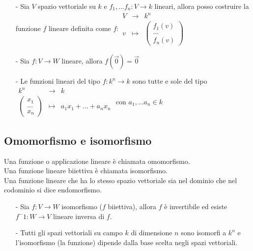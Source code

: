 \documentclass[a4paper]{article}
\newcommand\f[4]{\begin{smallmatrix} {#1} &\to &{#2} \\ {#3} &\mapsto &{#4} \end{smallmatrix}}
\newcommand\psmatrix[3]{\left( \begin{smallmatrix} {#1} \\ {#2} \\ {#3} \end{smallmatrix} \right)}
\begin{document}
\begin{itemize}
	\item[-] Sia \(V\) spazio vettoriale su \(k\) e \(f_1, \dots f_n : V \to k\) lineari, allora posso costruire la funzione
	\(f\) lineare definita come \(f: \f{V}{k^n}{v}{\psmatrix{f_1(v)}{\dots}{f_n(v)}}\)

	\item[-] Sia \(f: V \to W\) lineare, allora \(f(\vec{0}) = \vec{0}\)
	
	\item[-] Le funzioni lineari del tipo \(f: k^n \to k\) sono tutte e sole del tipo \(\f{k^n}{k}{\psmatrix{x_1}{\dots}{x_n}}{a_1 x_1 + \dots + a_n x_n}\)
	con \(a_1, \dots a_n \in k\)
\end{itemize}

\subsection{Omomorfismo e isomorfismo}
Una funzione o applicazione lineare è chiamata omomorfismo. \\
Una funzione lineare biiettiva è chiamata isomorfismo. \\
Una funzione lineare che ha lo stesso spazio vettoriale sia nel dominio che nel codominio si dice endomorfismo.

\begin{itemize}
	\item[-] Sia \(f: V \to W\) isomorfismo (\(f\) biiettiva), allora \(f\) è invertibile ed esiste \(f^-1: W \to V\) lineare
	inversa di \(f\).

	\item[-] Tutti gli spazi vettoriali su campo \(k\) di dimensione \(n\) sono isomorfi a \(k^n\) e l'isomorfismo (la funzione)
	dipende dalla base scelta negli spazi vettoriali.
\end{itemize}
\end{document}
